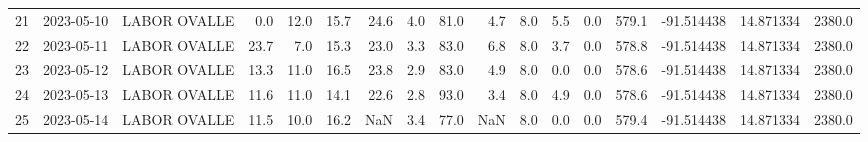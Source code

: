 \documentclass[12pt]{article}
\begin{document}
\begin{center}
\begin{tabular}{lllrrrrrrrrrrrrrr}
21  & 2023-05-10 &  LABOR OVALLE &     0.0 &  12.0 &   15.7 &  24.6 &      4.0 &     81.0 &        4.7 &  8.0 &         5.5 &         0.0 &      579.1 & -91.514438 &  14.871334 &   2380.0 \\
22  & 2023-05-11 &  LABOR OVALLE &    23.7 &   7.0 &   15.3 &  23.0 &      3.3 &     83.0 &        6.8 &  8.0 &         3.7 &         0.0 &      578.8 & -91.514438 &  14.871334 &   2380.0 \\
23  & 2023-05-12 &  LABOR OVALLE &    13.3 &  11.0 &   16.5 &  23.8 &      2.9 &     83.0 &        4.9 &  8.0 &         0.0 &         0.0 &      578.6 & -91.514438 &  14.871334 &   2380.0 \\
24  & 2023-05-13 &  LABOR OVALLE &    11.6 &  11.0 &   14.1 &  22.6 &      2.8 &     93.0 &        3.4 &  8.0 &         4.9 &         0.0 &      578.6 & -91.514438 &  14.871334 &   2380.0 \\
25  & 2023-05-14 &  LABOR OVALLE &    11.5 &  10.0 &   16.2 &   NaN &      3.4 &     77.0 &        NaN &  8.0 &         0.0 &         0.0 &      579.4 & -91.514438 &  14.871334 &   2380.0 \\
\bottomrule
\end{tabular}

        
        \end{center}
        
\end{document}
